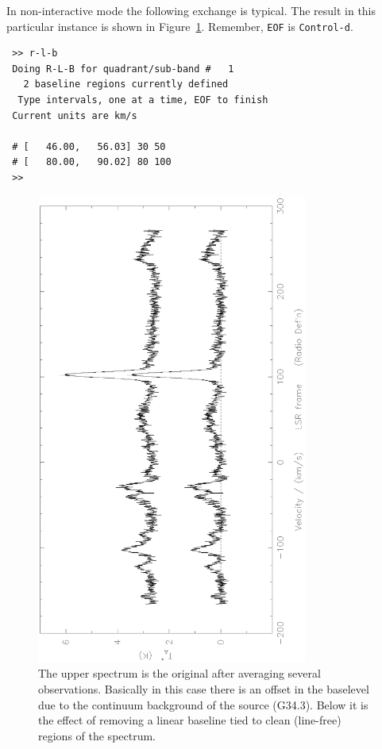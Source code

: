 \documentclass[11pt,twoside]{article}
\newcommand{\ctrld}{{\tt Control-d}}
\begin{document}
In non-interactive mode the following exchange is typical. The result
in this particular instance is shown in
Figure~\ref{fig:specx_rlb}. Remember, {\tt EOF} is \ctrld .
\begin{verbatim}
 >> r-l-b
 Doing R-L-B for quadrant/sub-band #   1
   2 baseline regions currently defined
  Type intervals, one at a time, EOF to finish
 Current units are km/s

 # [   46.00,   56.03] 30 50
 # [   80.00,   90.02] 80 100
 >>
\end{verbatim}
%
\begin{figure}[htb]
\centering
\includegraphics[angle=-90,width=3.5in]{sc8_rlb.ps}
\vspace*{-0.5cm}
\begin{center}
\begin{minipage}[t]{5in}
\caption[Removing a linear baseline]
{\small{The upper spectrum is the original after averaging several
observations. Basically in this case there is an offset in the
baselevel due to the continuum background of the source (G34.3). Below
it is the effect of removing a linear baseline tied to clean
(line-free) regions of the spectrum.}  }
\label{fig:specx_rlb}
\end{minipage}
\end{center}
\end{figure}
\end{document}
